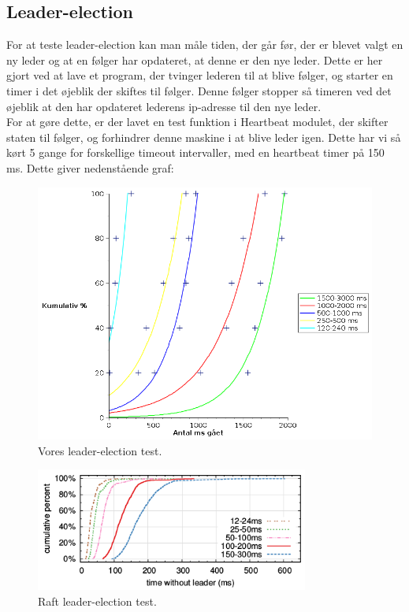 \documentclass[a4paper,12pt]{article}
\begin{document}
\subsection{Leader-election}
For at teste leader-election kan man måle tiden, der går før, der er blevet valgt en ny leder og at en følger har opdateret, at denne er den nye leder. Dette er her gjort ved at lave et program, der tvinger lederen til at blive følger, og starter en timer i det øjeblik der skiftes til følger. Denne følger stopper så timeren ved det øjeblik at den har opdateret lederens ip-adresse til den nye leder.
\\[5px]
For at gøre dette, er der lavet en test funktion i Heartbeat modulet, der skifter staten til følger, og forhindrer denne maskine i at blive leder igen.
Dette har vi så kørt 5 gange for forskellige timeout intervaller, med en heartbeat timer på 150 ms. 
Dette giver nedenstående graf:
\\
\begin{figure}[H]
  \caption{Vores leader-election test.}
  \centering
    \includegraphics[width=1.2\textwidth]{Newleadergraf.png}
\end{figure}

\begin{figure}[H]
  \caption{Raft leader-election test.}
  \centering
    \includegraphics[width=0.8\textwidth]{Raftleadergraf.png}
\end{figure}
\end{document}
